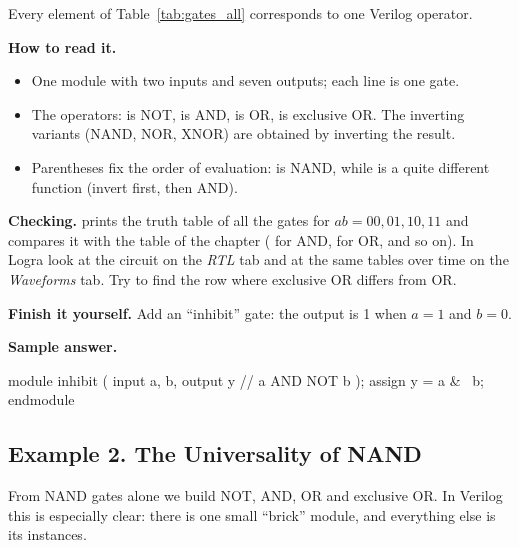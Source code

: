 Every element of Table~\ref{tab:gates_all} corresponds to one Verilog operator.


\textbf{How to read it.}
\begin{itemize}
  \item One module with two inputs and seven outputs; each  line is one gate.
  \item The operators: \code{\textasciitilde} is NOT, \code{\&} is AND, \code{|} is OR, \code{\^{}} is exclusive OR. The inverting variants (NAND, NOR, XNOR) are obtained by inverting the result.
  \item Parentheses fix the order of evaluation:  is NAND, while  is a quite different function (invert first, then AND).
\end{itemize}
\textbf{Checking.}  prints the truth table of all the
gates for $ab=00,01,10,11$ and compares it with the table of the chapter
( for AND,  for OR, and so on). In Logra look at the
circuit on the \emph{RTL} tab and at the same tables over time on the
\emph{Waveforms} tab. Try to find the row where exclusive OR differs from OR.

\textbf{Finish it yourself.} Add an ``inhibit'' gate: the output is 1 when
$a=1$ and $b=0$.

\textbf{Sample answer.}\par\nopagebreak
\begin{vcode}
module inhibit (
    input  a, b,
    output y          // a AND NOT b
);
    assign y = a & ~b;
endmodule
\end{vcode}

\subsection{Example 2. The Universality of NAND}

From NAND gates alone we build NOT, AND, OR and exclusive OR. In Verilog this is
especially clear: there is one small ``brick'' module, and everything else is
its instances.


